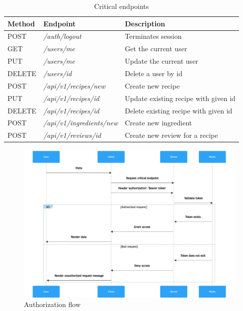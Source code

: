 \begin{table}
    \caption{Critical endpoints}
    \label{tab:critical-endpoints}
    \begin{tabulary}{1.0\textwidth}{|L|L|L|}
        \hline
        \textbf{Method} & \textbf{Endpoint} & \textbf{Description} \\
        \hline
        POST & \textit{/auth/logout} & Terminates session \\
        \hline
        GET & \textit{/users/me} & Get the current user \\
        \hline
        PUT & \textit{/users/me} & Update the current user \\
        \hline
        DELETE & \textit{/users/{id}} & Delete a user by id \\
        \hline
        POST & \textit{/api/v1/recipes/new} & Create new recipe \\
        \hline
        PUT & \textit{/api/v1/recipes/{id}} & Update existing recipe with given id \\
        \hline
        DELETE & \textit{/api/v1/recipes/{id}} & Delete existing recipe with given id \\
        \hline
        POST & \textit{/api/v1/ingredients/new} & Create new ingredient \\
        \hline
        POST & \textit{/api/v1/reviews/id} & Create new review for a recipe \\
        \hline
    \end{tabulary}
\end{table}


\begin{figure}[!b]
    \centering
    \includegraphics[width=\textwidth]{../../img/chapter-4/authorized.png}
    \caption{Authorization flow}
    \label{fig:authorization-flow}
\end{figure}

